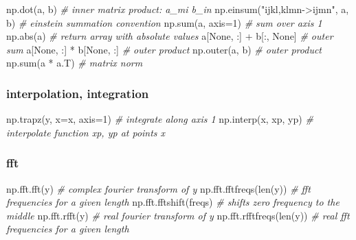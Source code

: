 \documentclass[]{article}
\newenvironment{Shaded}{}{}
\newcommand{\DataTypeTok}[1]{\textcolor[rgb]{0.56,0.13,0.00}{{#1}}}
\newcommand{\DecValTok}[1]{\textcolor[rgb]{0.25,0.63,0.44}{{#1}}}
\newcommand{\StringTok}[1]{\textcolor[rgb]{0.25,0.44,0.63}{{#1}}}
\newcommand{\CommentTok}[1]{\textcolor[rgb]{0.38,0.63,0.69}{\textit{{#1}}}}
\newcommand{\OtherTok}[1]{\textcolor[rgb]{0.00,0.44,0.13}{{#1}}}
\newcommand{\NormalTok}[1]{{#1}}
\begin{document}
\begin{Shaded}
\begin{Highlighting}[]
\NormalTok{np.dot(a, b) }\CommentTok{# inner matrix product: a_mi b_in}
\NormalTok{np.einsum(}\StringTok{"ijkl,klmn->ijmn"}\NormalTok{, a, b) }\CommentTok{# einstein summation convention}
\NormalTok{np.}\DataTypeTok{sum}\NormalTok{(a, axis=}\DecValTok{1}\NormalTok{) }\CommentTok{# sum over axis 1}
\NormalTok{np.}\DataTypeTok{abs}\NormalTok{(a) }\CommentTok{# return array with absolute values}
\NormalTok{a[}\OtherTok{None}\NormalTok{, :] + b[:, }\OtherTok{None}\NormalTok{] }\CommentTok{# outer sum}
\NormalTok{a[}\OtherTok{None}\NormalTok{, :] * b[}\OtherTok{None}\NormalTok{, :] }\CommentTok{# outer product}
\NormalTok{np.outer(a, b) }\CommentTok{# outer product}
\NormalTok{np.}\DataTypeTok{sum}\NormalTok{(a * a.T) }\CommentTok{# matrix norm}
\end{Highlighting}
\end{Shaded}

\subsubsection{interpolation, integration}

\begin{Shaded}
\begin{Highlighting}[]
\NormalTok{np.trapz(y, x=x, axis=}\DecValTok{1}\NormalTok{) }\CommentTok{# integrate along axis 1}
\NormalTok{np.interp(x, xp, yp) }\CommentTok{# interpolate function xp, yp at points x}
\end{Highlighting}
\end{Shaded}

\subsubsection{fft}

\begin{Shaded}
\begin{Highlighting}[]
\NormalTok{np.fft.fft(y) }\CommentTok{# complex fourier transform of y}
\NormalTok{np.fft.fftfreqs(}\DataTypeTok{len}\NormalTok{(y)) }\CommentTok{# fft frequencies for a given length}
\NormalTok{np.fft.fftshift(freqs) }\CommentTok{# shifts zero frequency to the middle}
\NormalTok{np.fft.rfft(y) }\CommentTok{# real fourier transform of y}
\NormalTok{np.fft.rfftfreqs(}\DataTypeTok{len}\NormalTok{(y)) }\CommentTok{# real fft frequencies for a given length}
\end{Highlighting}
\end{Shaded}
\end{document}
